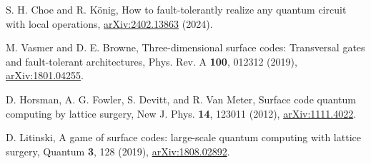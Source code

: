 S. H. Choe and R. K\"onig, How to fault-tolerantly realize any quantum circuit with local operations, \href{https://arxiv.org/abs/2402.13863}{arXiv:2402.13863} (2024).

M. Vasmer and D. E. Browne, Three-dimensional surface codes: Transversal gates and fault-tolerant architectures, Phys. Rev. A \textbf{100}, 012312 (2019), \href{https://arxiv.org/abs/1801.04255}{arXiv:1801.04255}.

D. Horsman, A. G. Fowler, S. Devitt, and R. Van Meter, Surface code quantum computing by lattice surgery, New J. Phys. \textbf{14}, 123011 (2012), \href{https://arxiv.org/abs/1111.4022}{arXiv:1111.4022}.

D. Litinski, A game of surface codes: large-scale quantum computing with lattice surgery, Quantum \textbf{3}, 128 (2019), \href{https://arxiv.org/abs/1808.02892}{arXiv:1808.02892}.
